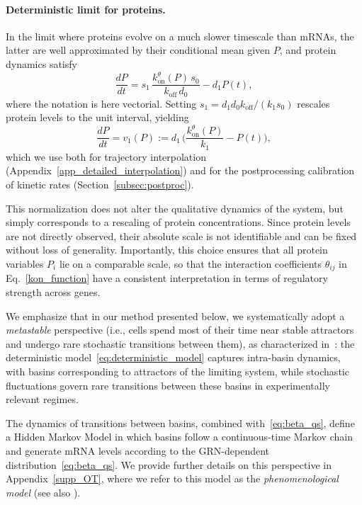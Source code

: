 \documentclass[a4paper, 11pt]{article}
\theoremstyle{plain}
\theoremstyle{remark}
\begin{document}
\paragraph{Deterministic limit for proteins.}
In the limit where proteins evolve on a much slower timescale than mRNAs, the latter are well approximated by their conditional mean given $P$, and protein dynamics satisfy
\begin{equation*}
\frac{dP}{dt} = s_{1} \,\frac{k^{\theta}_{\mathrm{on}}(P)\,s_0}{k_{\mathrm{off}}\,d_0} - d_{1} P(t),
\end{equation*}
where the notation is here vectorial. Setting $s_1 = d_1 d_0 k_{\mathrm{off}} / (k_1 s_0)$ rescales protein levels to the unit interval, yielding
\begin{equation}
\label{eq:deterministic_model}
\frac{dP}{dt} = v_1(P) := d_{1}\,\biggl(\frac{k^{\theta}_{\mathrm{on}}(P)}{k_1} - P(t)\biggr),
\end{equation}
which we use both for trajectory interpolation (Appendix~\ref{app_detailed_interpolation}) and for the postprocessing calibration of kinetic rates (Section~\ref{subsec:postproc}).

This normalization does not alter the qualitative dynamics of the system, but simply corresponds to a rescaling of protein concentrations. Since protein levels are not directly observed, their absolute scale is not identifiable and can be fixed without loss of generality. Importantly, this choice ensures that all protein variables $P_i$ lie on a comparable scale, so that the interaction coefficients $\theta_{ij}$ in Eq.~\eqref{kon_function} have a consistent interpretation in terms of regulatory strength across genes.


We emphasize that in our method presented below, we systematically adopt a \textit{metastable} perspective (i.e., cells spend most of their time near stable attractors and undergo rare stochastic transitions between them), as characterized in~\cite{ventre2020reduction}: the deterministic model~\eqref{eq:deterministic_model} captures intra-basin dynamics, with basins corresponding to attractors of the limiting system, while stochastic fluctuations govern rare transitions between these basins in experimentally relevant regimes.

The dynamics of transitions between basins, combined with~\eqref{eq:beta_qs}, define a Hidden Markov Model in which basins follow a continuous-time Markov chain and generate mRNA levels according to the GRN-dependent distribution~\eqref{eq:beta_qs}. We provide further details on this perspective in Appendix~\ref{supp_OT}, where we refer to this model as the \textit{phenomenological model} (see also \cite{ventre2020reduction}).
\end{document}

